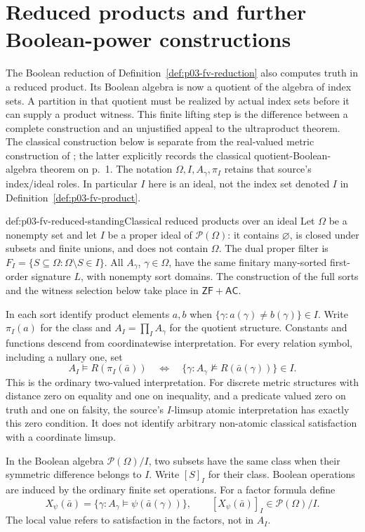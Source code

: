 \section{Reduced products and further Boolean-power constructions}
\label{sec:p03-fv-reduced-composition}

The Boolean reduction of Definition~\ref{def:p03-fv-reduction} also
computes truth in a reduced product. Its Boolean algebra is now a quotient
of the algebra of index sets. A partition in that quotient must be realized
by actual index sets before it can supply a product witness. This finite
lifting step is the difference between a complete construction and an
unjustified appeal to the ultraproduct theorem. The classical construction
below is separate from the real-valued metric construction of
\cite[\S2.3 and \S3]{Ghasemi2016MetricFVv3}; the latter explicitly records
the classical quotient-Boolean-algebra theorem on p.~1. The notation
\(\Omega,I,A_\gamma,\pi_I\) retains that source's index/ideal roles.
In particular \(I\) here is an ideal, not the index set denoted \(I\)
in Definition~\ref{def:p03-fv-product}.

\begin{hbdefinition}{def:p03-fv-reduced-standing}{Classical reduced products over an ideal}
Let \(\Omega\) be a nonempty set and let \(I\) be a proper ideal of
\(\mathcal P(\Omega)\): it contains \(\varnothing\), is closed under
subsets and finite unions, and does not contain \(\Omega\).
The dual proper filter is
\(F_I=\{S\subseteq\Omega:\Omega\setminus S\in I\}\).
All \(A_\gamma\), \(\gamma\in\Omega\), have the same finitary
many-sorted first-order signature \(L\), with nonempty sort domains.
The construction of the full sorts and the witness selection below take
place in \(\mathsf{ZF}+\mathsf{AC}\).

In each sort identify product elements \(a,b\) when
\(\{\gamma:a(\gamma)\ne b(\gamma)\}\in I\). Write \(\pi_I(a)\)
for the class and \(A_I=\prod_I A_\gamma\) for the quotient structure.
Constants and functions descend from coordinatewise interpretation.
For every relation symbol, including a nullary one, set
\[
 A_I\models R(\pi_I(\bar a))
 \quad\Longleftrightarrow\quad
 \{\gamma:A_\gamma\not\models R(\bar a(\gamma))\}\in I.
\]
This is the ordinary two-valued interpretation. For discrete metric
structures with distance zero on equality and one on inequality, and a
predicate valued zero on truth and one on falsity, the source's
\(I\)-limsup atomic interpretation has exactly this zero condition.
It does not identify arbitrary non-atomic classical satisfaction with a
coordinate limsup.

In the Boolean algebra \(\mathcal P(\Omega)/I\), two subsets have the
same class when their symmetric difference belongs to \(I\).
Write \([S]_I\) for their class. Boolean operations are induced by the
ordinary finite set operations. For a factor formula define
\[
 X_\psi(\bar a)=\{\gamma:A_\gamma\models\psi(\bar a(\gamma))\},
 \qquad [X_\psi(\bar a)]_I\in\mathcal P(\Omega)/I.
\]
The local value refers to satisfaction in the factors, not in \(A_I\).
\end{hbdefinition}

